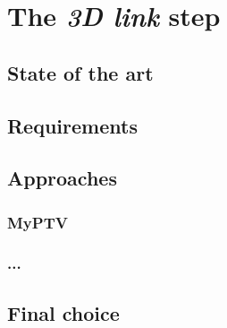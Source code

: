 \chapter{The \textit{3D link} step}
\label{chap:3dlink}

\section{State of the art}
\section{Requirements}
\section{Approaches}
\subsection{MyPTV}
\subsection{...}
\section{Final choice}
